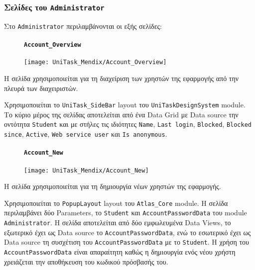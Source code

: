             \subsubsection{Σελίδες του \texttt{Administrator}}
                Στο \texttt{Administrator} περιλαμβάνονται οι εξής σελίδες:

                \begin{figure}[H] \noindent
                    \paragraph{\texttt{Account\_Overview}}
                    \begin{center}
                        \texttt{[image: UniTask\_Mendix/Account\_Overview]}
                    \end{center}
                \end{figure}

                    Η σελίδα χρησιμοποιείται για τη διαχείριση των χρηστών της εφαρμογής από την πλευρά των διαχειριστών.

                    Χρησιμοποιείται το \texttt{UniTask\_SideBar} layout του \texttt{UniTaskDesignSystem} module. Το κύριο μέρος της σελίδας αποτελείται από ένα Data Grid με Data source την οντότητα \texttt{Student} και με στήλες τις ιδιότητες \texttt{Name}, \texttt{Last login}, \texttt{Blocked}, \texttt{Blocked since}, \texttt{Active}, \texttt{Web service user} και \texttt{Is anonymous}.

                \begin{figure}[H] \noindent
                    \paragraph{\texttt{Account\_New}}
                    \begin{center}
                        \texttt{[image: UniTask\_Mendix/Account\_New]}
                    \end{center}
                \end{figure}

                    Η σελίδα χρησιμοποιείται για τη δημιουργία νέων χρηστών της εφαρμογής.

                    Χρησιμοποιείται το \texttt{PopupLayout} layout του \texttt{Atlas\_Core} module. Η σελίδα περιλαμβάνει δύο Parameters, το \texttt{Student} και \texttt{AccountPasswordData} του module \linebreak \texttt{Administrator}. Η σελίδα αποτελείται από δύο εμφωλευμένα Data Views, το εξωτερικό έχει ως Data source το \texttt{AccountPasswordData}, ενώ το εσωτερικό έχει ως Data source τη συσχέτιση του \texttt{AccountPasswordData} με το \texttt{Student}. Η χρήση του \texttt{AccountPasswordData} είναι απαραίτητη καθώς η δημιουργία ενός νέου χρήστη χρειάζεται την αποθήκευση του κωδικού πρόσβασής του.

